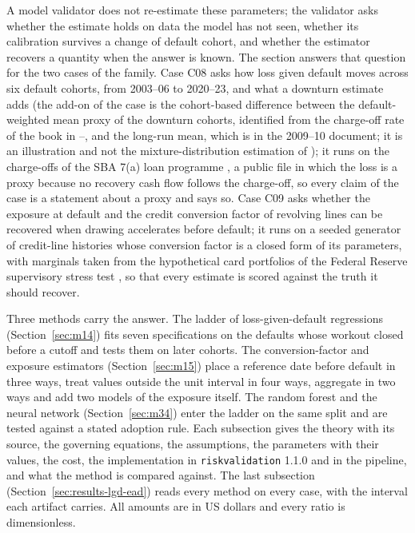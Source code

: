 A model validator does not re-estimate these parameters; the validator asks whether the estimate holds on data the model has not seen, whether its calibration survives a change of default cohort, and whether the estimator recovers a quantity when the answer is known. The section answers that question for the two cases of the family. Case C08 asks how loss given default moves across six default cohorts, from 2003--06 to 2020--23, and what a downturn estimate adds (the add-on of the case is the cohort-based difference between the default-weighted mean proxy of the downturn cohorts, identified from the charge-off rate of the book in --, and the long-run mean, which is  in the 2009--10 document; it is an illustration and not the mixture-distribution estimation of \citealt{lgd-ead:calabrese2014}); it runs on the charge-offs of the SBA 7(a) loan programme \citep{lgd-ead:sbafoia}, a public file in which the loss is a proxy because no recovery cash flow follows the charge-off, so every claim of the case is a statement about a proxy and says so. Case C09 asks whether the exposure at default and the credit conversion factor of revolving lines can be recovered when drawing accelerates before default; it runs on a seeded generator of credit-line histories whose conversion factor is a closed form of its parameters, with marginals taken from the hypothetical card portfolios of the Federal Reserve supervisory stress test \citep{lgd-ead:fedstress2025,lgd-ead:fedmethod2025}, so that every estimate is scored against the truth it should recover.

Three methods carry the answer. The ladder of loss-given-default regressions (Section~\ref{sec:m14}) fits seven specifications on the defaults whose workout closed before a cutoff and tests them on later cohorts. The conversion-factor and exposure estimators (Section~\ref{sec:m15}) place a reference date before default in three ways, treat values outside the unit interval in four ways, aggregate in two ways and add two models of the exposure itself. The random forest and the neural network (Section~\ref{sec:m34}) enter the ladder on the same split and are tested against a stated adoption rule. Each subsection gives the theory with its source, the governing equations, the assumptions, the parameters with their values, the cost, the implementation in \texttt{riskvalidation} 1.1.0 and in the pipeline, and what the method is compared against. The last subsection (Section~\ref{sec:results-lgd-ead}) reads every method on every case, with the interval each artifact carries. All amounts are in US dollars and every ratio is dimensionless.

